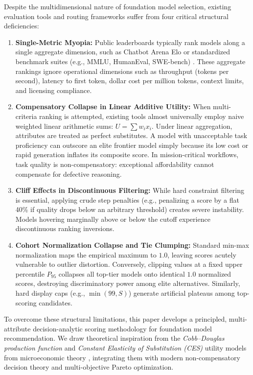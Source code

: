 \documentclass[pdflatex,sn-mathphys-num]{sn-jnl}
\theoremstyle{thmstyleone}
\theoremstyle{thmstylethree}
\begin{document}
Despite the multidimensional nature of foundation model selection, existing evaluation tools and routing frameworks suffer from four critical structural deficiencies:
\begin{enumerate}
  \item \textbf{Single-Metric Myopia:} Public leaderboards typically rank models along a single aggregate dimension, such as Chatbot Arena Elo or standardized benchmark suites (e.g., MMLU, HumanEval, SWE-bench) \cite{hendrycks2020measuring, chen2021evaluating, jimenez2023swe}. These aggregate rankings ignore operational dimensions such as throughput (tokens per second), latency to first token, dollar cost per million tokens, context limits, and licensing compliance.
  \item \textbf{Compensatory Collapse in Linear Additive Utility:} When multi-criteria ranking is attempted, existing tools almost universally employ naive weighted linear arithmetic sums: $U = \sum w_i x_i$. Under linear aggregation, attributes are treated as perfect substitutes. A model with unacceptable task proficiency can outscore an elite frontier model simply because its low cost or rapid generation inflates its composite score. In mission-critical workflows, task quality is non-compensatory: exceptional affordability cannot compensate for defective reasoning.
  \item \textbf{Cliff Effects in Discontinuous Filtering:} While hard constraint filtering is essential, applying crude step penalties (e.g., penalizing a score by a flat 40\% if quality drops below an arbitrary threshold) creates severe instability. Models hovering marginally above or below the cutoff experience discontinuous ranking inversions.
  \item \textbf{Cohort Normalization Collapse and Tie Clumping:} Standard min-max normalization maps the empirical maximum to $1.0$, leaving scores acutely vulnerable to outlier distortion. Conversely, clipping values at a fixed upper percentile $P_{95}$ collapses all top-tier models onto identical $1.0$ normalized scores, destroying discriminatory power among elite alternatives. Similarly, hard display caps (e.g., $\min(99, S)$) generate artificial plateaus among top-scoring candidates.
\end{enumerate}

To overcome these structural limitations, this paper develops a principled, multi-attribute decision-analytic scoring methodology for foundation model recommendation. We draw theoretical inspiration from the \emph{Cobb--Douglas production function} \cite{cobb1928theory} and \emph{Constant Elasticity of Substitution (CES)} utility models from microeconomic theory \cite{arrow1961capital}, integrating them with modern non-compensatory decision theory \cite{tversky1972elimination} and multi-objective Pareto optimization.
\end{document}
